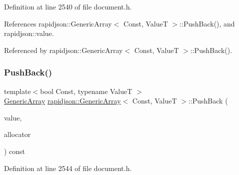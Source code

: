 Definition at line 2540 of file document.\+h.


\begin{DoxyCode}{0}

\end{DoxyCode}


References rapidjson\+::\+Generic\+Array$<$ Const, Value\+T $>$\+::\+Push\+Back(), and rapidjson\+::value.



Referenced by rapidjson\+::\+Generic\+Array$<$ Const, Value\+T $>$\+::\+Push\+Back().

\mbox{\label{classrapidjson_1_1_generic_array_a673eda4c52685461b5bbeccf2f2b5c88}} 
\subsubsection{\texorpdfstring{PushBack()}{PushBack()}\hspace{0.1cm}{\footnotesize\ttfamily [2/2]}}
{\footnotesize\ttfamily template$<$bool Const, typename ValueT $>$ \\
\mbox{\hyperlink{classrapidjson_1_1_generic_array}{Generic\+Array}} \mbox{\hyperlink{classrapidjson_1_1_generic_array}{rapidjson\+::\+Generic\+Array}}$<$ Const, ValueT $>$\+::Push\+Back (\begin{DoxyParamCaption}\item[{\mbox{\hyperlink{classrapidjson_1_1_generic_array_ad52689025256c94097a0e7bb1c70620e}{String\+Ref\+Type}}}]{value,  }\item[{\mbox{\hyperlink{classrapidjson_1_1_generic_array_a82298d507b2b15c9d909c25a32f5afeb}{Allocator\+Type}} \&}]{allocator }\end{DoxyParamCaption}) const}



Definition at line 2544 of file document.\+h.


\begin{DoxyCode}{0}

\end{DoxyCode}


